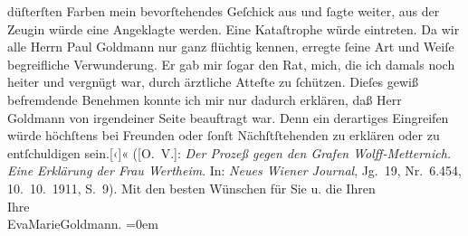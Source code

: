 \begin{ledgroupsized}[t]{13cm}
{{{                     düſterſten Farben mein bevorſtehendes Geſchick aus und ſagte weiter, aus der
                        Zeugin würde eine
                     Angeklagte werden. Eine Kataſtrophe würde eintreten. Da wir alle Herrn Paul Goldmann nur ganz flüchtig kennen,
                     erregte ſeine Art und Weiſe begreifliche Verwunderung. Er gab mir ſogar den
                     Rat, mich, die ich damals noch heiter und vergnügt war, durch ärztliche Atteſte
                     zu ſchützen. Dieſes gewiß befremdende Benehmen konnte ich mir nur dadurch
                     erklären, daß Herr Goldmann von
                     irgendeiner Seite beauftragt war. Denn ein derartiges Eingreifen würde
                     höchſtens bei Freunden oder ſonſt Nächſtſtehenden zu erklären oder zu
                     entſchuldigen sein.{[}‹{]}« ([O. V.]: \emph{Der Prozeß gegen den
                        Grafen Wolff-Metternich. Eine Erklärung der Frau Wertheim}. In: \emph{Neues Wiener Journal}, Jg. 19, Nr. 6.454,
                        10. 10. 1911, S. 9)}}}\label{K_L03540-5h}.\pend
           \pstart
           Mit den besten Wünschen für {\pb}Sie u. die Ihren
               {\\[\baselineskip]}Ihre {\\[\baselineskip]}\spacefill\mbox{EvaMarieGoldmann.}\pend
           \leftskip=0em{}
         
         \endnumbering{}\end{ledgroupsized}  \newcommand{\dateiname}{L03540}\newcommand{\titel}{Eva Marie Goldmann an Arthur Schnitzler, 21. 9. 1911}\newcommand{\editorInnen}{Martin Anton Müller und Laura Untner}
      